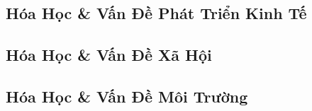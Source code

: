 \documentclass{article}
\numberwithin{equation}{section}
\begin{document}
\subsection{Hóa Học \& Vấn Đề Phát Triển Kinh Tế}


\subsection{Hóa Học \& Vấn Đề Xã Hội}


\subsection{Hóa Học \& Vấn Đề Môi Trường}


\printbibliography[heading=bibintoc]
	
\end{document}
